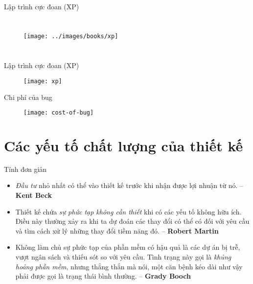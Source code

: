 \documentclass{beamer}
\newcommand{\ul}[1]{\emph{#1}}
\begin{document}
\begin{frame}{Lập trình cực đoan (XP)}
    \begin{columns}
        \begin{figure}
            \centering
            \texttt{[image: ../images/books/xp]}
        \end{figure}
    \end{columns}
\end{frame}

\begin{frame}{Lập trình cực đoan (XP)}
    \begin{figure}
        \centering
        \texttt{[image: xp]}
    \end{figure}
\end{frame}

\begin{frame}{Chi phí của bug}
    \begin{figure}
        \centering
        \texttt{[image: cost-of-bug]}
    \end{figure}
\end{frame}

\section{Các yếu tố chất lượng của thiết kế}

\begin{frame}{Tính đơn giản}
    \begin{itemize}
        \item \ul{\color{red}Đầu tư} nhỏ nhất có thể vào thiết kế trước khi
        nhận được lợi nhuận từ nó. -- \textbf{Kent Beck}
        \item Thiết kế chứa \ul{\color{red}sự phức tạp không cần thiết} khi
        có các yếu tố không hữu ích. Điều này thường xảy ra khi
        ta dự đoán các thay đổi có thể có đối với yêu cầu và tìm cách
        xử lý những thay đổi tiềm năng đó. -- \textbf{Robert Martin}        
        \item Không làm chủ sự phức tạp của phần mềm 
        có hậu quả là các dự án bị trễ, vượt ngân sách và thiếu sót
        so với yêu cầu. Tình trạng này gọi là
        \ul{\color{red}khủng hoảng phần mềm}, nhưng thẳng thắn mà nói,
        một căn bệnh kéo dài như vậy phải được gọi là
        trạng thái bình thường. -- \textbf{Grady Booch}
    \end{itemize}
\end{frame}
\end{document}
